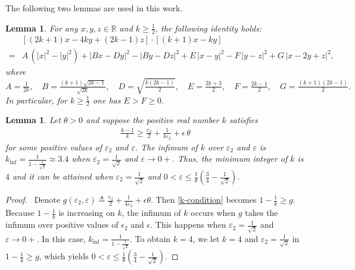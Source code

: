 \documentclass{article}
\newtheorem{lemma}[theorem]{Lemma}          %
\theoremstyle{definition}                   %
\begin{document}
The following two lemmas  are used in this work. 
\begin{lemma}
\label{lemma:algebraic_identity}
For any $x,y,z\in\mathbb{R}$ and $k\ge\tfrac12$, the following identity holds:
\begin{equation}\label{eq:alg-identity}
\begin{aligned}
&[ (2k+1)x - 4ky + (2k-1)z ] \cdot 
 [ (k+1)x - k y ]\\
= &  A\,(|x|^2 - |y|^2)
  + \lvert Bx - D y\rvert^2 
  - \lvert B y - D z\rvert^2
  + E\,\lvert x - y\rvert^2
  - F\,\lvert y - z\rvert^2
  + G\,\lvert x - 2y + z\rvert^2,
\end{aligned}
\end{equation}
where
\[
A = \tfrac1{2k},\quad
B = \tfrac{(k+1)\sqrt{2k-1}}{\sqrt{2k}},\quad
D = \sqrt{\tfrac{k(2k-1)}2},\quad
E = \tfrac{2k+3}2,\quad
F = \tfrac{2k-1}2,\quad
G = \tfrac{(k+1)(2k-1)}2.
\]
In particular, for $k\ge\tfrac12$ one has $E>F\ge 0$.
\end{lemma}
%
%
\begin{lemma}
\label{lemma-k-values}
Let  $\theta>0$ and suppose the positive real number $k$ satisfies 
\begin{align}
\frac{k-1}{k}\ge \frac{\varepsilon_2}{2}
+\frac{1}{4\varepsilon_2} + \epsilon \,\theta
\label{k-condition}
\end{align}
for some positive values of $\varepsilon_2$ and $\varepsilon$. 
The infimum of $k$ over $\varepsilon_2$ and $\varepsilon$ is $k_{\inf}=\frac{1}{1 - \frac{1}{\sqrt{2}}}\approx 3.4$ when $\varepsilon_2=\frac{1}{\sqrt{2}}$ and $\varepsilon\to 0+$. 
Thus, the minimum integer of $k$ is $4$ and it can be attained when $\varepsilon_2=\frac{1}{\sqrt{2}}$ and $0<\varepsilon \le \frac{1}{\theta} \left( \frac{3}{4} - \frac{1}{\sqrt{2}} \right)$. 
\end{lemma}

\begin{proof}
\,\newline
Denote $g(\varepsilon_2, \varepsilon)\triangleq \frac{\varepsilon_2}{2}+\frac{1}{4\varepsilon_2} + \epsilon \theta$.  
Then \eqref{k-condition} becomes 
$1-\frac{1}{k} \ge g$.
Because $1-\frac{1}{k}$ is increasing on $k$, the infimum of $k$ occurs when $g$ takes the infimum over positive values of $\epsilon_2$ and $\epsilon$. This happens when $\varepsilon_2=\frac{1}{\sqrt{2}}$ and $\varepsilon\to 0+$. In this case, $k_{\inf}=\frac{1}{1 - \frac{1}{\sqrt{2}}}$. 
To obtain $k=4$, we let $k=4$ and $\varepsilon_2=\frac{1}{\sqrt{2}}$ in $1-\frac{1}{k}\ge g$,  which yields $0<\varepsilon \le \frac{1}{\theta}\left( \frac{3}{4} - \frac{1}{\sqrt{2}} \right)$.

\end{proof}
\end{document}

